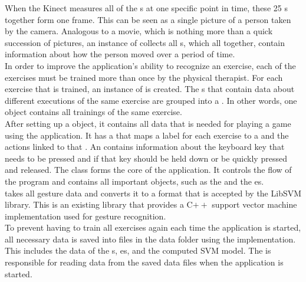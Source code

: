 When the Kinect measures all of the s at one specific point in time, these 25 s together form one frame. This can be seen as a single picture of a person taken by the camera. Analogous to a movie, which is nothing more than a quick succession of pictures, an instance of  collects all s, which all together, contain information about how the person moved over a period of time.\\

In order to improve the application's ability to recognize an exercise, each of the exercises must be trained more than once by the physical therapist. For each exercise that is trained, an instance of  is created. The s that contain data about different executions of the same exercise are grouped into a . In other words, one  object contains all trainings of the same exercise.\\

After setting up a  object, it contains all data that is needed for playing a game using the application. It has a  that maps a label for each exercise to a  and the actions linked to that . An  contains information about the keyboard key that needs to be pressed and if that key should be held down or be quickly pressed and released. The  class forms the core of the application. It controls the flow of the program and contains all important objects, such as the  and the es.\\

 takes all gesture data and converts it to a format that is accepted by the LibSVM library. This is an existing library that provides a C$++$ support vector machine implementation used for gesture recognition.\\

To prevent having to train all exercises again each time the application is started, all necessary data is saved into files in the data folder using the  implementation. This includes the data of the s, es,  and the computed SVM model. The  is responsible for reading data from the saved data files when the application is started.


